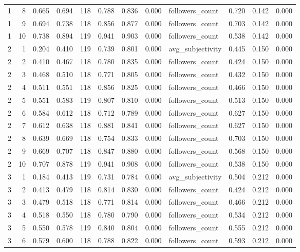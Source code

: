 \begin{tabular}{rrrrrrrrlrrr}
1 & 8 & 0.665 & 0.694 & 118 & 0.788 & 0.836 & 0.000 & followers_count & 0.720 & 0.142 & 0.000 \\
1 & 9 & 0.694 & 0.738 & 118 & 0.856 & 0.877 & 0.000 & followers_count & 0.703 & 0.142 & 0.000 \\
1 & 10 & 0.738 & 0.894 & 119 & 0.941 & 0.903 & 0.000 & followers_count & 0.538 & 0.142 & 0.000 \\
2 & 1 & 0.204 & 0.410 & 119 & 0.739 & 0.801 & 0.000 & avg_subjectivity & 0.445 & 0.150 & 0.000 \\
2 & 2 & 0.410 & 0.467 & 118 & 0.780 & 0.835 & 0.000 & followers_count & 0.424 & 0.150 & 0.000 \\
2 & 3 & 0.468 & 0.510 & 118 & 0.771 & 0.805 & 0.000 & followers_count & 0.432 & 0.150 & 0.000 \\
2 & 4 & 0.511 & 0.551 & 118 & 0.856 & 0.825 & 0.000 & followers_count & 0.466 & 0.150 & 0.000 \\
2 & 5 & 0.551 & 0.583 & 119 & 0.807 & 0.810 & 0.000 & followers_count & 0.513 & 0.150 & 0.000 \\
2 & 6 & 0.584 & 0.612 & 118 & 0.712 & 0.789 & 0.000 & followers_count & 0.627 & 0.150 & 0.000 \\
2 & 7 & 0.612 & 0.638 & 118 & 0.881 & 0.841 & 0.000 & followers_count & 0.627 & 0.150 & 0.000 \\
2 & 8 & 0.639 & 0.669 & 118 & 0.754 & 0.833 & 0.000 & followers_count & 0.703 & 0.150 & 0.000 \\
2 & 9 & 0.669 & 0.707 & 118 & 0.847 & 0.880 & 0.000 & followers_count & 0.568 & 0.150 & 0.000 \\
2 & 10 & 0.707 & 0.878 & 119 & 0.941 & 0.908 & 0.000 & followers_count & 0.538 & 0.150 & 0.000 \\
3 & 1 & 0.184 & 0.413 & 119 & 0.731 & 0.784 & 0.000 & avg_subjectivity & 0.504 & 0.212 & 0.000 \\
3 & 2 & 0.413 & 0.479 & 118 & 0.814 & 0.830 & 0.000 & followers_count & 0.424 & 0.212 & 0.000 \\
3 & 3 & 0.479 & 0.518 & 118 & 0.771 & 0.814 & 0.000 & followers_count & 0.466 & 0.212 & 0.000 \\
3 & 4 & 0.518 & 0.550 & 118 & 0.780 & 0.790 & 0.000 & followers_count & 0.534 & 0.212 & 0.000 \\
3 & 5 & 0.550 & 0.578 & 119 & 0.840 & 0.804 & 0.000 & followers_count & 0.555 & 0.212 & 0.000 \\
3 & 6 & 0.579 & 0.600 & 118 & 0.788 & 0.822 & 0.000 & followers_count & 0.593 & 0.212 & 0.000 \\

\end{tabular}
